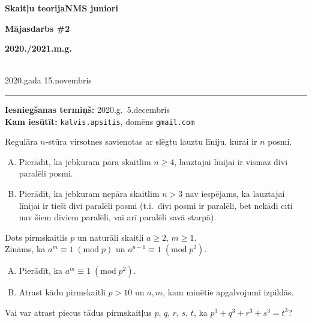 \documentclass[a4paper,12pt]{article}
\begin{document}
\begin{center}
\parbox{3.5cm}{\flushleft\bf Skaitļu teorija\linebreak NMS juniori} \hfill {\bf\LARGE Mājasdarbs \#2} \hfill \parbox{3.5cm}{\flushright\bf 2020./2021.m.g.} \\[2pt]
\rm\small 2020.gada 15.novembris
\end{center}

\hrule

\vspace{10pt}
{\bf Iesniegšanas termiņš:} 2020.g.\ 5.decembris\\
{\bf Kam iesūtīt:} {\tt kalvis.apsitis}, domēns {\tt gmail.com}

\vspace{10pt}
\begin{problem}
Regulāra $n$-stūra virsotnes savienotas ar slēgtu lauztu līniju, kurai ir $n$ posmi.
\begin{enumerate}[(A)]
\item Pierādīt, ka jebkuram pāra skaitlim $n \geq 4$, lauztajai līnijai ir vismaz divi 
paralēli posmi.
\item Pierādīt, ka jebkuram nepāra skaitlim $n > 3$ nav iespējams, ka lauztajai līnijai 
ir tieši divi paralēli posmi (t.i.\ divi posmi ir paralēli, bet nekādi citi nav šiem diviem paralēli, 
vai arī paralēli savā starpā).
\end{enumerate}
\end{problem}

\vspace{10pt}
\begin{problem} 
Dots pirmskaitlis $p$ un naturāli skaitļi $a \geq 2$, $m \geq 1$.\\
Zināms, ka $a^m \equiv 1\;(\text{mod}\;p)$ un $a^{p-1} \equiv 1\;(\text{mod}\;p^2)$.
\begin{enumerate}[(A)]
\item
Pierādīt, ka $a^m \equiv 1\;(\text{mod}\;p^2)$.
\item 
Atrast kādu pirmskaitli $p>10$ un $a,m$, kam minētie apgalvojumi izpildās.
\end{enumerate}
\end{problem}

\vspace{10pt}
\begin{problem}
Vai var atrast piecus tādus pirmskaitļus $p$, $q$, $r$, $s$, $t$, ka 
$p^3 + q^3 + r^3 + s^3 = t^3$? 
\end{problem}
\end{document}
